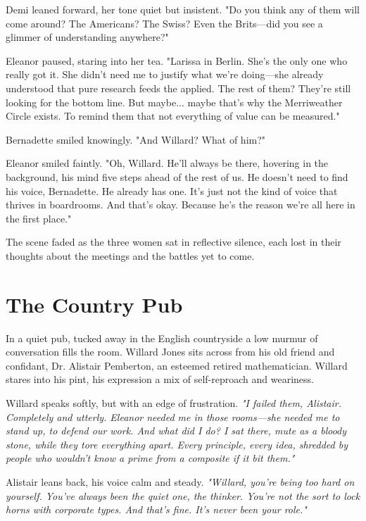 Demi leaned forward, her tone quiet but insistent. "Do you think any of them will come around? The Americans? The Swiss? Even the Brits—did you see a glimmer of understanding anywhere?"
\smallskip

Eleanor paused, staring into her tea. "Larissa in Berlin. She’s the only one who really got it. She didn’t need me to justify what we’re doing—she already understood that pure research feeds the applied. The rest of them? They’re still looking for the bottom line. But maybe... maybe that’s why the Merriweather Circle exists. To remind them that not everything of value can be measured."
\smallskip

Bernadette smiled knowingly. "And Willard? What of him?"
\smallskip

Eleanor smiled faintly. "Oh, Willard. He’ll always be there, hovering in the background, his mind five steps ahead of the rest of us. He doesn’t need to find his voice, Bernadette. He already has one. It’s just not the kind of voice that thrives in boardrooms. And that’s okay. Because he’s the reason we’re all here in the first place."

\smallskip

The scene faded as the three women sat in reflective silence, each lost in their thoughts about the meetings and the battles yet to come.


\newpage
\section*{The Country Pub}

\smallskip

In a quiet pub, tucked away in the English countryside a low murmur of conversation fills the room. Willard Jones sits across from his old friend and confidant, Dr. Alistair Pemberton, an esteemed retired mathematician. Willard stares into his pint, his expression a mix of self-reproach and weariness.

\smallskip

Willard speaks softly, but with an edge of frustration.  
\textit{"I failed them, Alistair. Completely and utterly. Eleanor needed me in those rooms—she needed me to stand up, to defend our work. And what did I do? I sat there, mute as a bloody stone, while they tore everything apart. Every principle, every idea, shredded by people who wouldn’t know a prime from a composite if it bit them."}
\smallskip

Alistair leans back, his voice calm and steady.  
\textit{"Willard, you’re being too hard on yourself. You’ve always been the quiet one, the thinker. You’re not the sort to lock horns with corporate types. And that’s fine. It’s never been your role."}
\smallskip

